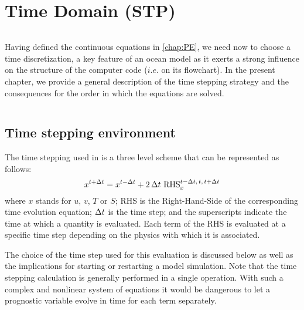\documentclass[../tex_main/NEMO_manual]{subfiles}
\begin{document}
\chapter{Time Domain (STP) }
\label{chap:STP}
\minitoc





\newpage
$\ $\newline    %


Having defined the continuous equations in \autoref{chap:PE}, we need now to choose a time discretization,
a key feature of an ocean model as it exerts a strong influence on the structure of the computer code
($i.e.$ on its flowchart).
In the present chapter, we provide a general description of the \NEMO time stepping strategy and
the consequences for the order in which the equations are solved.

$\ $\newline    %
\section{Time stepping environment}
\label{sec:STP_environment}

The time stepping used in \NEMO is a three level scheme that can be represented as follows:
\begin{equation} \label{eq:STP}
   x^{t+\Delta t} = x^{t-\Delta t} + 2 \, \Delta t \  \text{RHS}_x^{t-\Delta t,\,t,\,t+\Delta t}
\end{equation} 
where $x$ stands for $u$, $v$, $T$ or $S$;
RHS is the Right-Hand-Side of the corresponding time evolution equation;
$\Delta t$ is the time step;
and the superscripts indicate the time at which a quantity is evaluated.
Each term of the RHS is evaluated at a specific time step depending on the physics with which it is associated.

The choice of the time step used for this evaluation is discussed below as well as
the implications for starting or restarting a model simulation.
Note that the time stepping calculation is generally performed in a single operation.
With such a complex and nonlinear system of equations it would be dangerous to let a prognostic variable evolve in
time for each term separately.
\end{document}
